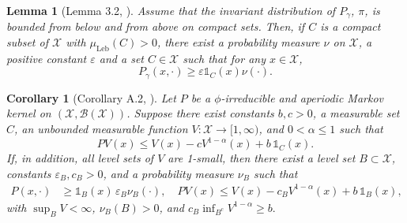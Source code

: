 \documentclass[pdflatex,sn-mathphys-num]{sn-jnl}
\newcommand{\ind}{\mathds{1}}
\renewcommand{\geq}{\geqslant}
\renewcommand{\leq}{\leqslant}
\theoremstyle{thmstyleone}
\newtheorem{lemma}{Lemma}
\newtheorem{corollary}{Corollary}
\theoremstyle{thmstyletwo}
\theoremstyle{thmstylethree}
\begin{document}
\begin{lemma}[Lemma 3.2, \cite{atchade_limit_2010}]
Assume that the invariant distribution of $P_\gamma$, $\pi$, is bounded from below and from above on compact sets. Then, if $C$ is a compact subset of $\mathcal{X}$ with $\mu_\text{Leb}(C) > 0$, there exist a probability measure $\nu$ on $\mathcal{X}$, a positive constant $\varepsilon$ and a set $C \in \mathcal{X}$ such that for any $x\in \mathcal{X}$,
\[
P_\gamma(x, \cdot) \geq \varepsilon \ind_C(x)  \nu(\cdot).
\]
\label{appendix:lemma1}
\end{lemma}

\begin{corollary}[Corollary A.2, \cite{atchade_limit_2010}]
Let \( P \) be a \(\phi\)-irreducible and aperiodic Markov kernel on \( (\mathcal{X}, \mathcal{B}(\mathcal{X})) \). Suppose there exist constants \( b, c > 0 \), a measurable set \( C \), an unbounded measurable function \( V \colon \mathcal{X} \to [1, \infty) \), and \( 0 < \alpha \leq 1 \) such that
\[
PV(x) \leq V(x) - c V^{1-\alpha}(x) + b\, \ind_C(x).
\]
If, in addition, all level sets of \( V \) are 1-small, then there exist a level set \( B \subset \mathcal{X} \), constants \( \varepsilon_B, c_B > 0 \), and a probability measure \( \nu_B \) such that
\begin{align*}
P(x,\cdot) &\geq \ind_B(x)\, \varepsilon_B \nu_B(\cdot), \quad
PV(x) \leq V(x) - c_B V^{1-\alpha}(x) + b\, \ind_B(x),
\end{align*}
with $\sup_B V < \infty$, $\nu_B(B) > 0$, and $c_B \inf_{B^c} V^{1-\alpha} \geq b.$
\label{appendix:Corollary1}
\end{corollary}
\end{document}
